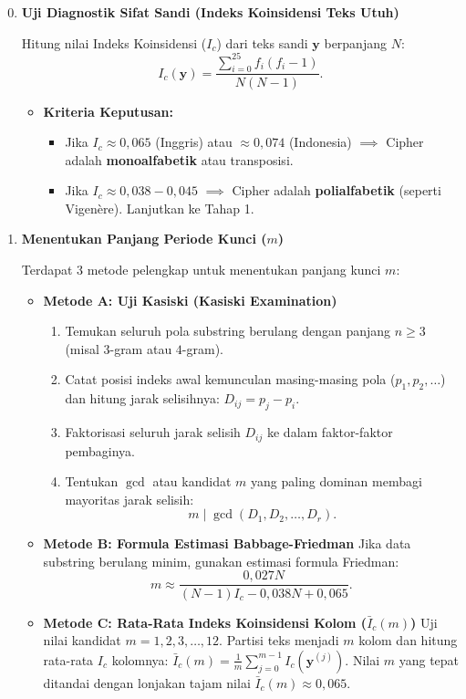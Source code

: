 \documentclass[11pt,a4paper]{article}
\begin{document}
\begin{enumerate}[label=\textbf{Tahap \arabic* :}, leftmargin=*]
    \setcounter{enumi}{-1}
    \item \textbf{Uji Diagnostik Sifat Sandi (Indeks Koinsidensi Teks Utuh)}
    
    Hitung nilai Indeks Koinsidensi ($I_c$) dari teks sandi $\mathbf{y}$ berpanjang $N$:
    \[
    I_c(\mathbf{y}) = \frac{\sum_{i=0}^{25} f_i(f_i - 1)}{N(N - 1)}.
    \]
    \begin{itemize}[leftmargin=*]
        \item \textbf{Kriteria Keputusan:}
        \begin{itemize}
            \item Jika $I_c \approx 0{,}065$ (Inggris) atau $\approx 0{,}074$ (Indonesia) $\implies$ Cipher adalah \textbf{monoalfabetik} atau transposisi.
            \item Jika $I_c \approx 0{,}038 - 0{,}045$ $\implies$ Cipher adalah \textbf{polialfabetik} (seperti Vigenère). Lanjutkan ke Tahap 1.
        \end{itemize}
    \end{itemize}

    \item \textbf{Menentukan Panjang Periode Kunci ($m$)}
    
    Terdapat 3 metode pelengkap untuk menentukan panjang kunci $m$:
    \begin{itemize}[leftmargin=*]
        \item \textbf{Metode A: Uji Kasiski (Kasiski Examination)}
        \begin{enumerate}[label=\alph*., leftmargin=*]
            \item Temukan seluruh pola substring berulang dengan panjang $n \ge 3$ (misal $3$-gram atau $4$-gram).
            \item Catat posisi indeks awal kemunculan masing-masing pola ($p_1, p_2, \dots$) dan hitung jarak selisihnya: $D_{ij} = p_j - p_i$.
            \item Faktorisasi seluruh jarak selisih $D_{ij}$ ke dalam faktor-faktor pembaginya.
            \item Tentukan $\gcd$ atau kandidat $m$ yang paling dominan membagi mayoritas jarak selisih:
            \[
            m \mid \gcd(D_1, D_2, \dots, D_r).
            \]
        \end{enumerate}
        \item \textbf{Metode B: Formula Estimasi Babbage-Friedman}
        Jika data substring berulang minim, gunakan estimasi formula Friedman:
        \[
        m \approx \frac{0{,}027 N}{(N - 1)I_c - 0{,}038 N + 0{,}065}.
        \]
        \item \textbf{Metode C: Rata-Rata Indeks Koinsidensi Kolom ($\bar{I}_c(m)$)}
        Uji nilai kandidat $m = 1, 2, 3, \dots, 12$. Partisi teks menjadi $m$ kolom dan hitung rata-rata $I_c$ kolomnya: $\bar{I}_c(m) = \frac{1}{m}\sum_{j=0}^{m-1} I_c(\mathbf{y}^{(j)})$. Nilai $m$ yang tepat ditandai dengan lonjakan tajam nilai $\bar{I}_c(m) \approx 0{,}065$.
    \end{itemize}


\end{enumerate}
\end{document}
